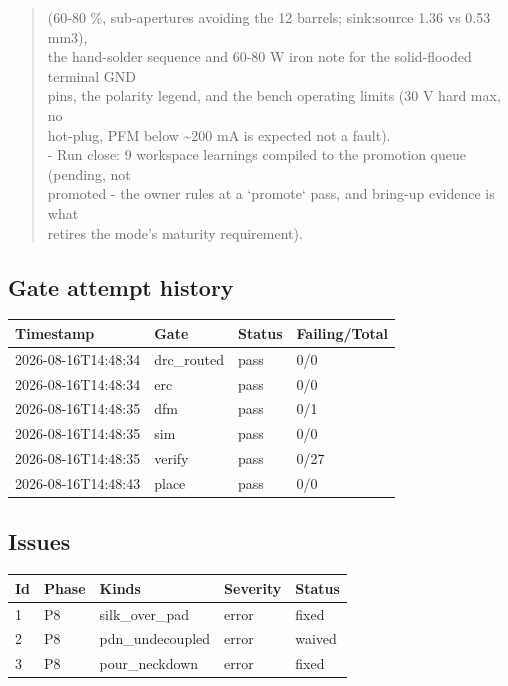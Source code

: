 \documentclass[11pt,a4paper]{article}
\begin{document}
\begin{quote}
  (60-80 \%, sub-apertures avoiding the 12 barrels; sink:source 1.36 vs 0.53 mm3),\\
  the hand-solder sequence and 60-80 W iron note for the solid-flooded terminal GND\\
  pins, the polarity legend, and the bench operating limits (30 V hard max, no\\
  hot-plug, PFM below \textasciitilde{}200 mA is expected not a fault).\\
- Run close: 9 workspace learnings compiled to the promotion queue (pending, not\\
  promoted - the owner rules at a `promote` pass, and bring-up evidence is what\\
  retires the mode's maturity requirement).
\end{quote}
\subsection*{Gate attempt history}
{\small
\begin{longtable}{llll}
\toprule
\textbf{Timestamp} & \textbf{Gate} & \textbf{Status} & \textbf{Failing/Total} \\
\midrule
\endhead
2026-08-16T14:48:34 & drc\_routed & pass & 0/0 \\
2026-08-16T14:48:34 & erc & pass & 0/0 \\
2026-08-16T14:48:35 & dfm & pass & 0/1 \\
2026-08-16T14:48:35 & sim & pass & 0/0 \\
2026-08-16T14:48:35 & verify & pass & 0/27 \\
2026-08-16T14:48:43 & place & pass & 0/0 \\
\bottomrule
\end{longtable}
}
\subsection*{Issues}
{\small
\begin{longtable}{llp{5cm}ll}
\toprule
\textbf{Id} & \textbf{Phase} & \textbf{Kinds} & \textbf{Severity} & \textbf{Status} \\
\midrule
\endhead
1 & P8 & silk\_over\_pad & error & fixed \\
2 & P8 & pdn\_undecoupled & error & waived \\
3 & P8 & pour\_neckdown & error & fixed \\
\bottomrule
\end{longtable}
}
\end{document}

